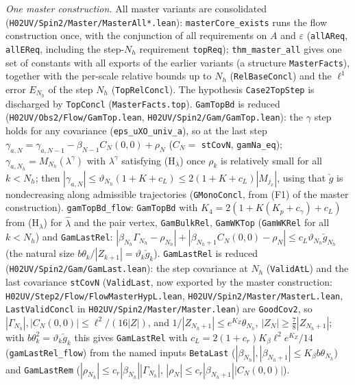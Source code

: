 \documentclass[11pt]{amsart}
\theoremstyle{definition}
\theoremstyle{remark}
\numberwithin{equation}{section}
\begin{document}
\emph{One master construction.} All master variants are consolidated (\texttt{H02UV/Spin2/Master/MasterAll*.lean}): \texttt{masterCore\_exists} runs the flow construction once, with the conjunction of all requirements on $A$ and $\varepsilon$ (\texttt{allAReq}, \texttt{allEReq}, including the step-$N_h$ requirement \texttt{topReq}); \texttt{thm\_master\_all} gives one set of constants with all exports of the earlier variants (a structure \texttt{MasterFacts}), together with the per-scale relative bounds up to $N_h$ (\texttt{RelBaseConcl}) and the $\ell^1$ error $E_{N_h}$ of the step $N_h$ (\texttt{TopRelConcl}). The hypothesis \texttt{Case2TopStep} is discharged by \texttt{TopConcl} (\texttt{MasterFacts.top}).
\texttt{GamTopBd} is reduced (\texttt{H02UV/Obs2/Flow/GamTop.lean}, \texttt{H02UV/Spin2/Gam/GamTop.lean}): the $\gamma$ step holds for any covariance
(\texttt{eps\_uXO\_univ\_a}), so at the last step $\gamma_{a,N}=\gamma_{a,N-1}-\beta_{N-1}C_N(0,0)+\rho_N$ ($C_N=$ \texttt{stCovN}, \texttt{gamNa\_eq});
$\gamma_{a,N_h}=M_{N_h}(\lambda^\gamma)$ with $\lambda^\gamma$ satisfying (H$_\lambda$) once $\rho_k$ is relatively small for all $k<N_h$; then
$|\gamma_{a,N}|\le\vartheta_{N_h}(1+K+c_L)\le2(1+K+c_L)|M_{j_x}|$, using that $\check g$ is nondecreasing along admissible trajectories
(\texttt{GMonoConcl}, from (F1) of the master construction). \texttt{gamTopBd\_flow}: \texttt{GamTopBd} with $K_4=2(1+K(K_p+c_\gamma)+c_L)$ from
(H$_\lambda$) for $\hat\lambda$ and the pair vertex, \texttt{GamBulkRel}, \texttt{GamWKTop} (\texttt{GamWKRel} for all $k<N_h$) and
\texttt{GamLastRel}: $|\beta_{N_h}\Gamma_{N_h}-\rho_{N_h}|+|\beta_{N_h+1}C_N(0,0)-\rho_N|\le c_L\vartheta_{N_h}\check g_{N_h}$ (the natural size
$b\theta_k/|Z_{k+1}|=\vartheta_k\check g_k$).
\texttt{GamLastRel} is reduced (\texttt{H02UV/Spin2/Gam/GamLast.lean}): the step covariance at $N_h$ (\texttt{ValidAtL}) and the last covariance
\texttt{stCovN} (\texttt{ValidLast}, now exported by the master construction: \texttt{H02UV/Step2/Flow/FlowMasterHypL.lean}, \texttt{H02UV/Spin2/Master/MasterL.lean},
\texttt{LastValidConcl} in \texttt{H02UV/Spin2/Master/Master.lean}) are \texttt{GoodCov2}, so $|\Gamma_{N_h}|,|C_N(0,0)|\le\ell^2/(16|Z|)$, and $1/|Z_{N_h+1}|\le e^{K_Z}\theta_{N_h}$,
$|Z_N|\ge\frac78|Z_{N_h+1}|$; with $b\theta_k^2=\vartheta_k\check g_k$ this gives \texttt{GamLastRel} with $c_L=2(1+c_r)K_\beta\ell^2e^{K_Z}/14$
(\texttt{gamLastRel\_flow}) from the named inputs \texttt{BetaLast} ($|\beta_{N_h}|,|\beta_{N_h+1}|\le K_\beta b\theta_{N_h}$) and
\texttt{GamLastRem} ($|\rho_{N_h}|\le c_r|\beta_{N_h}||\Gamma_{N_h}|$, $|\rho_N|\le c_r|\beta_{N_h+1}||C_N(0,0)|$).
\end{document}
